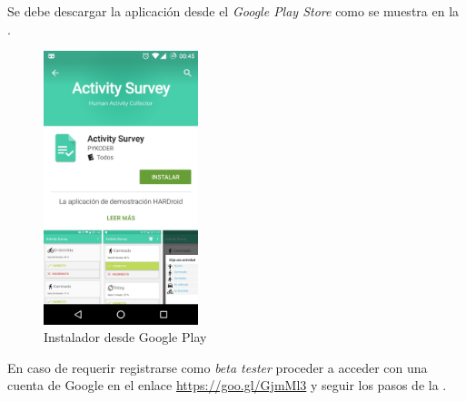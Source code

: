 Se debe descargar la aplicación desde el
\emph{Google Play Store} \cite{GimenezYegros2016e} como se muestra en la .
\begin{figure}[!h]
    \centering 
    \includegraphics[width=0.4\textwidth]{anexos/graphics/inst_app5.jpg}
\caption{Instalador desde Google Play}\label{first:id2}\end{figure}

En caso de requerir registrarse como \emph{beta tester} proceder a acceder con una cuenta de Google en el enlace \url{https://goo.gl/GjmMl3} y seguir los pasos de la .

